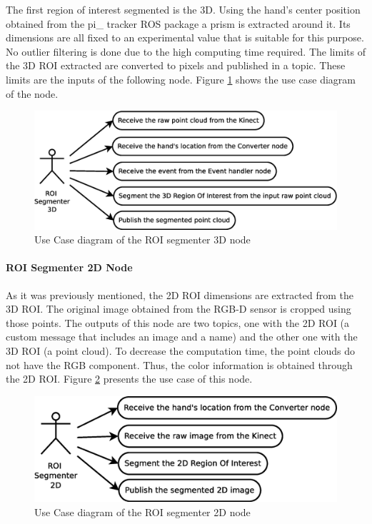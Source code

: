 \documentclass{article}
\begin{document}
The first region of interest segmented is the 3D. Using the hand's center position obtained from the pi\_ tracker ROS package a prism is extracted around it. Its dimensions are all fixed to an experimental value that is suitable for this purpose. 
No outlier filtering is done due to the high computing time required.  
The limits of the 3D ROI extracted are converted to pixels and published in a topic. These limits are the inputs of the following node. 
Figure \ref{uc_roi3d} shows the use case diagram of the node. 

\begin{figure}[H]
\begin{center}
	\includegraphics[scale=0.4]{../../img/diagrams/uc_roi_segmenter_3d.eps}
			\caption[Use case diagram ROI segmenter 3D node]{Use Case diagram of the ROI segmenter 3D node}
		\label{uc_roi3d}	

\end{center}
\end{figure}

\paragraph{ROI Segmenter 2D Node\\[0.5cm]}
As it was previously mentioned, the 2D ROI dimensions are extracted from the 3D ROI. The original image obtained from the RGB-D sensor is cropped using those points. 
The outputs of this node are two topics, one with the 2D ROI (a custom message that includes an image and a name) and the other one with the 3D ROI (a point cloud).
To decrease the computation time, the point clouds do not have the RGB component. Thus, the color information is obtained through the 2D ROI. 
Figure \ref{uc_roi2d} presents the use case of this node. 
\begin{figure}[H]
\begin{center}
	\includegraphics[scale=0.4]{../../img/diagrams/uc_roi_segmenter_2d.eps}
			\caption[Use case diagram ROI segmenter 2D node]{Use Case diagram of the ROI segmenter 2D node}
		\label{uc_roi2d}
\end{center}
\end{figure}
\end{document}
